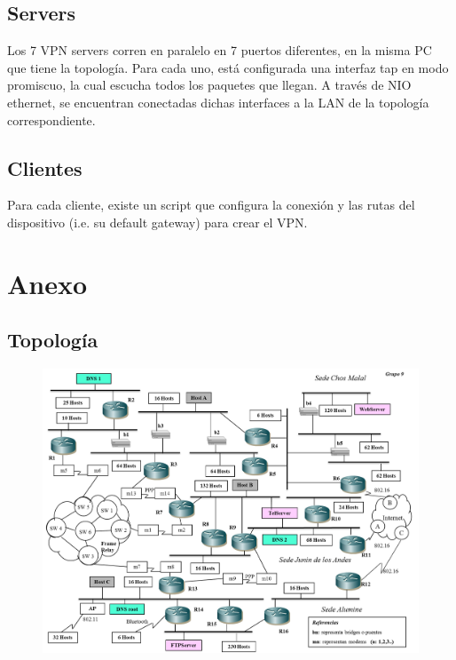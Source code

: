 \documentclass[12pt, a4paper, spanish]{article}
\begin{document}
\subsection{Servers}
Los 7 VPN servers corren en paralelo en 7 puertos diferentes, en la misma PC 
que tiene la topología.
Para cada uno, está configurada una interfaz tap en modo promiscuo, la cual 
escucha todos los paquetes que llegan.
A través de NIO ethernet, se encuentran conectadas dichas interfaces a la LAN 
de la topología correspondiente.

\subsection{Clientes}
Para cada cliente, existe un script que configura la conexión y 
las rutas del dispositivo (i.e. su default gateway) para crear el VPN.

\newpage
\section{Anexo}
\subsection{Topología}
\begin{figure}[h!]
	\centering
	\includegraphics[scale=0.45,angle=90]{diagramas/topologia.png} \\
\end{figure}
\end{document}
